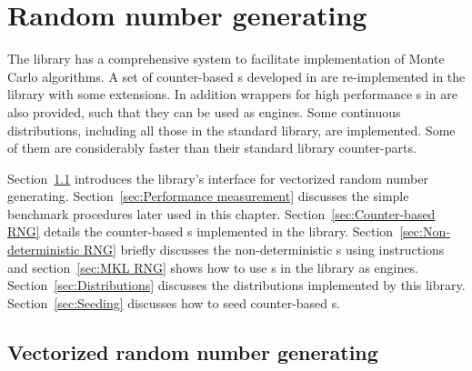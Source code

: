 \chapter{Random number generating}
\label{chap:Random number generating}

The library has a comprehensive \rng system to facilitate implementation of
Monte Carlo algorithms. A set of counter-based \rng{}s developed in
\textcite{Salmon:2011um} are re-implemented in the library with some
extensions. In addition wrappers for high performance \rng{}s in \mkl are also
provided, such that they can be used as \cppoo \rng engines. Some continuous
distributions, including all those in the standard library, are implemented.
Some of them are considerably faster than their standard library counter-parts.

Section~\ref{sec:Vectorized random number generating} introduces the library's
interface for vectorized random number generating. Section~\ref{sec:Performance
  measurement} discusses the simple benchmark procedures later used in this
chapter. Section~\ref{sec:Counter-based RNG} details the counter-based \rng{}s
implemented in the library. Section~\ref{sec:Non-deterministic RNG} briefly
discusses the non-deterministic \rng{}s using \rdrand instructions and
section~\ref{sec:MKL RNG} shows how to use \rng{}s in the \mkl library as
\cppoo engines. Section~\ref{sec:Distributions} discusses the distributions
implemented by this library. Section~\ref{sec:Seeding} discusses how to seed
counter-based \rng{}s.

\section{Vectorized random number generating}
\label{sec:Vectorized random number generating}

